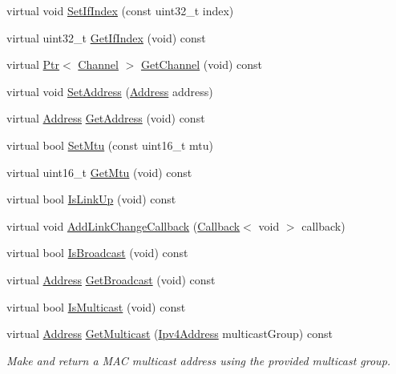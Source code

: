 \begin{DoxyCompactItemize}
virtual void \hyperlink{classns3_1_1OpenFlowSwitchNetDevice_a7cfbd893f5fb6b11f5c474996bfe5af0}{Set\+If\+Index} (const uint32\+\_\+t index)
\item 
virtual uint32\+\_\+t \hyperlink{classns3_1_1OpenFlowSwitchNetDevice_aaf611feb833d73a226d3028345a70bc2}{Get\+If\+Index} (void) const 
\item 
virtual \hyperlink{classns3_1_1Ptr}{Ptr}$<$ \hyperlink{classns3_1_1Channel}{Channel} $>$ \hyperlink{classns3_1_1OpenFlowSwitchNetDevice_a552c53c7d29d80cb0469df8a7c546eb2}{Get\+Channel} (void) const 
\item 
virtual void \hyperlink{classns3_1_1OpenFlowSwitchNetDevice_a3d005621ffcc3cc4dc43559598a17e1a}{Set\+Address} (\hyperlink{classns3_1_1Address}{Address} address)
\item 
virtual \hyperlink{classns3_1_1Address}{Address} \hyperlink{classns3_1_1OpenFlowSwitchNetDevice_a9ace12c079dd551ea876bc503599c4b4}{Get\+Address} (void) const 
\item 
virtual bool \hyperlink{classns3_1_1OpenFlowSwitchNetDevice_a23992b30d089b76aa2e41bef4c3d46e4}{Set\+Mtu} (const uint16\+\_\+t mtu)
\item 
virtual uint16\+\_\+t \hyperlink{classns3_1_1OpenFlowSwitchNetDevice_a2e153f7ee4b6d93661f90784edf44116}{Get\+Mtu} (void) const 
\item 
virtual bool \hyperlink{classns3_1_1OpenFlowSwitchNetDevice_aa96fe55aa7b2bea65974cbb5cd51161c}{Is\+Link\+Up} (void) const 
\item 
virtual void \hyperlink{classns3_1_1OpenFlowSwitchNetDevice_a3628df1997b920ab5542130c234f9108}{Add\+Link\+Change\+Callback} (\hyperlink{classns3_1_1Callback}{Callback}$<$ void $>$ callback)
\item 
virtual bool \hyperlink{classns3_1_1OpenFlowSwitchNetDevice_af5e13232837763f5978b2ff93697b7fe}{Is\+Broadcast} (void) const 
\item 
virtual \hyperlink{classns3_1_1Address}{Address} \hyperlink{classns3_1_1OpenFlowSwitchNetDevice_ac537d6ccd1e8a4083f846d669170ea79}{Get\+Broadcast} (void) const 
\item 
virtual bool \hyperlink{classns3_1_1OpenFlowSwitchNetDevice_aed07e20f6dede271e91c1eb727bb583e}{Is\+Multicast} (void) const 
\item 
virtual \hyperlink{classns3_1_1Address}{Address} \hyperlink{classns3_1_1OpenFlowSwitchNetDevice_a4eea48f6fa1c3a9720ded005f757a4cd}{Get\+Multicast} (\hyperlink{classns3_1_1Ipv4Address}{Ipv4\+Address} multicast\+Group) const 
\begin{DoxyCompactList}\small\item\em Make and return a M\+AC multicast address using the provided multicast group. \end{DoxyCompactList}\item 

\end{DoxyCompactItemize}
